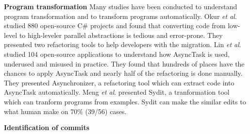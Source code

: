 \textbf{Program transformation}
Many studies have been conducted to understand program transformation and to transform programs automatically. Okur \textit{et al}. \cite{conf/ecoop/OkurED14} studied 880 open-source C\# projects and found that converting code from low-level to high-leveler parallel abstractions is tedious and error-prone. They presented two refactoring tools to help developers with the migration. Lin \textit{et al}. \cite{conf/sigsoft/LinRD14} studied 104 open-source applications to understand how AsyncTask is used, underused and misused in practice. They found that hundreds of places have the chances to apply AsyncTask and nearly half of the refactoring is done manually. They presented Asynchronizer, a refactoring tool which can extract code into AsyncTask automatically. Meng \textit{et al}. \cite{conf/pldi/MengKM11} presented Sydit, a tranformation tool which can tranform programs from examples. Sydit can make the similar edits to what human make on 70\% (39/56) cases.

\textbf{Identification of commits}